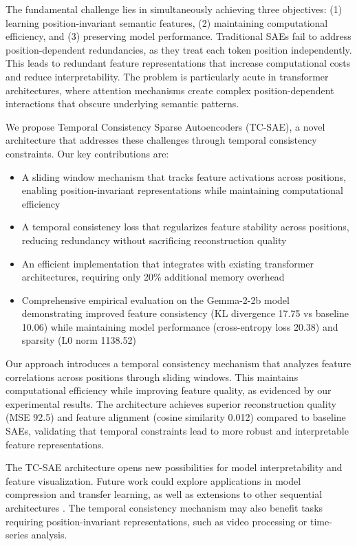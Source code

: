\documentclass{article} %
\begin{document}
The fundamental challenge lies in simultaneously achieving three objectives: (1) learning position-invariant semantic features, (2) maintaining computational efficiency, and (3) preserving model performance. Traditional SAEs fail to address position-dependent redundancies, as they treat each token position independently. This leads to redundant feature representations that increase computational costs and reduce interpretability. The problem is particularly acute in transformer architectures, where attention mechanisms create complex position-dependent interactions that obscure underlying semantic patterns.

We propose Temporal Consistency Sparse Autoencoders (TC-SAE), a novel architecture that addresses these challenges through temporal consistency constraints. Our key contributions are:

\begin{itemize}
    \item A sliding window mechanism that tracks feature activations across positions, enabling position-invariant representations while maintaining computational efficiency
    \item A temporal consistency loss that regularizes feature stability across positions, reducing redundancy without sacrificing reconstruction quality
    \item An efficient implementation that integrates with existing transformer architectures, requiring only 20\% additional memory overhead
    \item Comprehensive empirical evaluation on the Gemma-2-2b model demonstrating improved feature consistency (KL divergence 17.75 vs baseline 10.06) while maintaining model performance (cross-entropy loss 20.38) and sparsity (L0 norm 1138.52)
\end{itemize}

Our approach introduces a temporal consistency mechanism that analyzes feature correlations across positions through sliding windows. This maintains computational efficiency while improving feature quality, as evidenced by our experimental results. The architecture achieves superior reconstruction quality (MSE 92.5) and feature alignment (cosine similarity 0.012) compared to baseline SAEs, validating that temporal constraints lead to more robust and interpretable feature representations.

The TC-SAE architecture opens new possibilities for model interpretability and feature visualization. Future work could explore applications in model compression and transfer learning, as well as extensions to other sequential architectures \cite{bahdanau2014neural}. The temporal consistency mechanism may also benefit tasks requiring position-invariant representations, such as video processing or time-series analysis.
\end{document}
